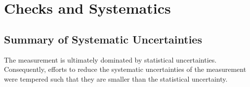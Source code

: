 




% 


\chapter{Checks and Systematics}
\label{sec:systematics}

\section{Summary of Systematic Uncertainties}
The measurement is ultimately dominated by statistical uncertainties. Consequently, efforts to reduce the systematic uncertainties of the measurement were tempered such that they are smaller than the statistical uncertainty.

